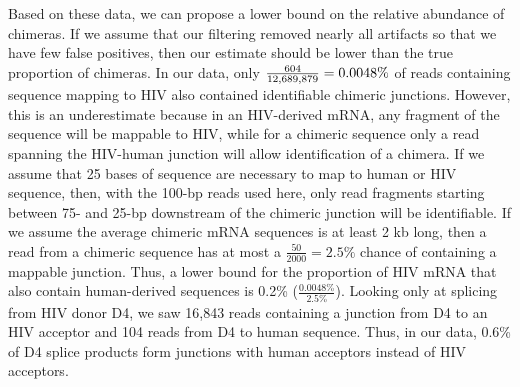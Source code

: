 \documentclass[../sherrill-Mix_thesis.tex]{subfiles}
\begin{document}

		Based on these data, we can propose a lower bound on the relative abundance of chimeras. If we assume that our filtering removed nearly all artifacts so that we have few false positives, then our estimate should be lower than the true proportion of chimeras. In our data, only $\frac{604}{12,689,879{}} = 0.0048\%$ of reads containing sequence mapping to HIV also contained identifiable chimeric junctions. However, this is an underestimate because in an HIV-derived mRNA, any fragment of the sequence will be mappable to HIV, while for a chimeric sequence only a read spanning the HIV-human junction will allow identification of a chimera. If we assume that 25 bases of sequence are necessary to map to human or HIV sequence, then, with the 100-bp reads used here, only read fragments starting between 75- and 25-bp downstream of the chimeric junction will be identifiable. If we assume the average chimeric mRNA sequences is at least 2 kb long, then a read from a chimeric sequence has at most a $\frac{50}{2000}=2.5\%$ chance of containing a mappable junction. Thus, a lower bound for the proportion of HIV mRNA that also contain human-derived sequences is 0.2\% ($\frac{0.0048\textrm{\%}}{2.5\%}$). Looking only at splicing from HIV donor D4, we saw 16,843 reads containing a junction from D4 to an HIV acceptor and 104 reads from D4 to human sequence. Thus, in our data, 0.6\% of D4 splice products form junctions with human acceptors instead of HIV acceptors.
\end{document}
